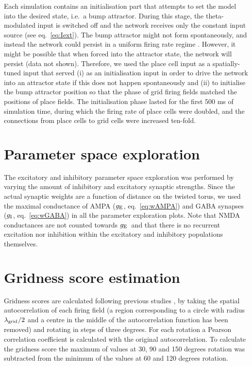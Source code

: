 \documentclass[a4paper,12pt]{article}
\newcommand{\ssc}[3]{\ensuremath{#1_{\text{#2}_{\text{#3}}}}}
\newcommand{\gE      }{\ssc{g}      {\scriptsize{E}}{}}
\newcommand{\gI      }{\ssc{g}      {\scriptsize{I}}{}}
\newcommand{\lamgrid}{\ssc{\lambda}{\scriptsize{grid}}{}}
\begin{document}
Each simulation contains an initialisation part that attempts to set the model
into the desired state, i.e.\ a bump attractor. During this stage, the
theta-modulated input is switched off and the network receives only the
constant input source (see eq.~\ref{eq:Iext}). The bump attractor might not
form spontaneously, and instead the network could persist in a  uniform firing
rate regime \citep{Compte:2000ul}. However, it might be possible that when
forced into the attractor state, the network will persist (data not shown).
Therefore, we used the place cell input as a spatially-tuned input that served
(i) as an initialisation input in order to drive the network into an attractor
state if this does not happen spontaneously and (ii) to initialise the bump
attractor position so that the phase of grid firing fields matched the positions
of place fields. The initialisation phase lasted for the first 500 ms of
simulation time, during which the firing rate of place cells were doubled, and
the connections from place cells to grid cells were increased ten-fold.



\section{Parameter space exploration} \label{sec:param_sweeps}

The excitatory and inhibitory parameter space exploration was performed by
varying the amount of inhibitory and excitatory synaptic strengths. Since the
actual synaptic weights are a function of distance on the twisted torus, we
used the maximal conductance of AMPA ($\gE$, eq.~\ref{eq:wAMPA}) and GABA
synapses ($\gI$, eq.~\ref{eq:wGABA}) in all the parameter exploration plots.
Note that NMDA conductances are not counted towards $\gE$\ and that there is no
recurrent excitation nor inhibition within the excitatory and inhibitory
populations themselves.



\section{Gridness score estimation}

Gridness scores are calculated following previous studies
\citep{Sargolini:2006ba}, by taking the spatial autocorrelation of each firing
field (a region corresponding to a circle with radius $\lamgrid/2$ and a centre
in the middle of the autocorrelation function has been removed) and rotating in
steps of three degrees.  For each rotation a Pearson correlation coefficient is
calculated with the original autocorrelation. To calculate the gridness score
the maximum of values at 30, 90 and 150 degrees rotation was subtracted from
the minimum of the values at 60 and 120 degrees rotation.
\end{document}
